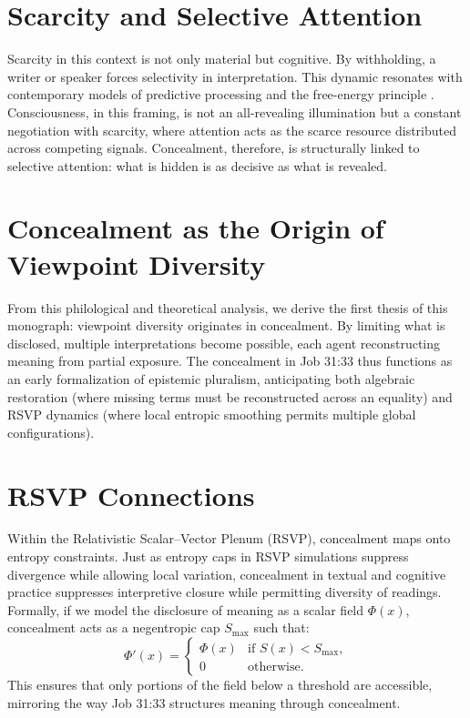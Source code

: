 \documentclass[a4paper,11pt,openany]{book}
\begin{document}
\section{Scarcity and Selective Attention}
Scarcity in this context is not only material but cognitive. By withholding, a writer or speaker forces selectivity in interpretation. This dynamic resonates with contemporary models of predictive processing and the free-energy principle \citep{friston2010freeenergy}. Consciousness, in this framing, is not an all-revealing illumination but a constant negotiation with scarcity, where attention acts as the scarce resource distributed across competing signals. Concealment, therefore, is structurally linked to selective attention: what is hidden is as decisive as what is revealed.

\section{Concealment as the Origin of Viewpoint Diversity}
From this philological and theoretical analysis, we derive the first thesis of this monograph: viewpoint diversity originates in concealment. By limiting what is disclosed, multiple interpretations become possible, each agent reconstructing meaning from partial exposure. The concealment in Job 31:33 thus functions as an early formalization of epistemic pluralism, anticipating both algebraic restoration (where missing terms must be reconstructed across an equality) and RSVP dynamics (where local entropic smoothing permits multiple global configurations).

\section{RSVP Connections}
Within the Relativistic Scalar–Vector Plenum (RSVP), concealment maps onto entropy constraints. Just as entropy caps in RSVP simulations suppress divergence while allowing local variation, concealment in textual and cognitive practice suppresses interpretive closure while permitting diversity of readings. Formally, if we model the disclosure of meaning as a scalar field $\Phi(x)$, concealment acts as a negentropic cap $S_{\text{max}}$ such that:
\[
\Phi'(x) = \begin{cases}
\Phi(x) & \text{if } S(x) < S_{\text{max}}, \\
0 & \text{otherwise}.
\end{cases}
\]
This ensures that only portions of the field below a threshold are accessible, mirroring the way Job 31:33 structures meaning through concealment.
\end{document}
